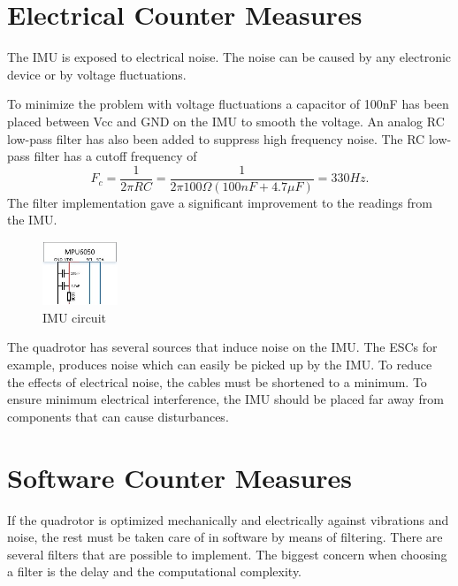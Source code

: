 \section{Electrical Counter Measures}
The IMU is exposed to electrical noise. The noise can be caused by any electronic device or by voltage fluctuations.\bigskip

To minimize the problem with voltage fluctuations a capacitor of 100nF has been placed between Vcc and GND on the IMU to smooth the voltage. An analog RC low-pass filter has also been added to suppress high frequency noise. The RC low-pass filter has a cutoff frequency of
\begin{equation}
    F_c = \frac{1}{2\pi RC} = \frac{1}{2\pi 100\Omega (100nF + 4.7\mu F)} = 330 Hz. 
\end{equation}
The filter implementation gave a significant improvement to the readings from the IMU. 
\begin{figure}[H]
    \centering
         \includegraphics[width = 0.2\textwidth]{VAPIQ-PICTURES/Sensor.jpg}
      \caption{IMU circuit}
    \label{fig:PIKK}
\end{figure} 
The quadrotor has several sources that induce noise on the IMU. The ESCs for example, produces noise which can easily be picked up by the IMU. To reduce the effects of electrical noise, the cables must be shortened to a minimum. To ensure minimum electrical interference, the IMU should be placed far away from components that can cause disturbances. 

\section{Software Counter Measures}
If the quadrotor is optimized mechanically and electrically against vibrations and noise, the rest must be taken care of in software by means of filtering. There are several filters that are possible to implement. The biggest concern when choosing a filter is the delay and the computational complexity.\bigskip


